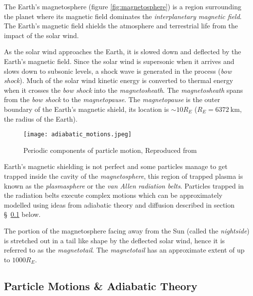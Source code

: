 The Earth's magnetosphere (figure \ref{fig:magnetosphere}) is a region surrounding the planet where its magnetic field 
dominates the \emph{interplanetary magnetic field}. The Earth's magnetic field shields the atmosphere and terrestrial life 
from the impact of the solar wind. 

As the solar wind approaches the Earth, it is slowed down and deflected by the Earth's magnetic field. Since the 
solar wind is supersonic when it arrives and slows down to subsonic levels, a shock wave is generated in the 
process (\emph{bow shock}). Much of the solar wind kinetic energy is converted to thermal energy when it crosses 
the \emph{bow shock} into the \emph{magnetosheath}. The \emph{magnetosheath} spans from the \emph{bow shock} to 
the \emph{magnetopause}. The \emph{magnetopause} is the outer boundary of the Earth's magnetic shield, its location 
is $\sim 10R_E$ ($R_E = \SI{6372}{\kilo\metre}$, the radius of the Earth). 

\begin{wrapfigure}{r}{0.4\textwidth}
    \centering\texttt{[image: adiabatic\_motions.jpeg]}
    \caption{
        {\small Periodic components of particle motion, Reproduced from \citet{roederer2012dynamics}}}
    \label{fig:particlemotions}
\end{wrapfigure}


Earth's magnetic shielding is not perfect and some particles manage to get trapped inside the cavity of the 
\emph{magnetosphere}, this region of trapped plasma is known as the \emph{plasmasphere} or the \emph{van Allen 
radiation belts}. Particles trapped in the radiation belts execute complex motions which can be approximately 
modelled using ideas from adiabatic theory and diffusion described in section \S~\ref{sec:plasmadiff} below. 

The portion of the magnetosphere facing away from the Sun (called the \emph{nightside}) is stretched out in  
a tail like shape by the deflected solar wind, hence it is referred to as the \emph{magnetotail}. The 
\emph{magnetotail} has an approximate extent of up to $1000R_E$.


\subsection{Particle Motions \& Adiabatic Theory} \label{sec:plasmadiff}


